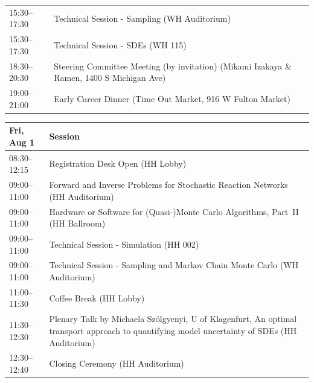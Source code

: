 \documentclass[12pt,lettersize,oneside]{book} %
\begin{document}
\begin{table}
{\begin{tabularx}{\textwidth}{>{\hsize=0.32\hsize}X|>{\hsize=1.7\hsize}X}
\cellcolor{\SessionLightColor}15:30--17:30 & \cellcolor{\SessionLightColor}Technical Session - Sampling (WH Auditorium) \\
\cellcolor{\SessionLightColor}15:30--17:30 & \cellcolor{\SessionLightColor}Technical Session - SDEs (WH 115) \\
\cellcolor{\SessionTitleColor}18:30--20:30 & \cellcolor{\SessionTitleColor}Steering Committee Meeting (by invitation) (Mikami Izakaya \& Ramen, 1400 S Michigan Ave) \\
\cellcolor{\EmptyColor}19:00--21:00 & \cellcolor{\EmptyColor}Early Career Dinner (Time Out Market, 916 W Fulton Market) \\
\hline
\end{tabularx}
}
\end{table}

\begin{table}
{\footnotesize
\begin{tabularx}{\textwidth}{>{\hsize=0.32\hsize}X|>{\hsize=1.7\hsize}X}
\hline
\textbf{Fri, Aug 1} & \textbf{Session} \\
\hline
\cellcolor{\EmptyColor}08:30--12:15 & \cellcolor{\EmptyColor}Registration Desk Open (HH Lobby) \\
\cellcolor{\SessionTitleColor}09:00--11:00 & \cellcolor{\SessionTitleColor}Forward and Inverse Problems for Stochastic Reaction Networks (HH Auditorium) \\
\cellcolor{\SessionTitleColor}09:00--11:00 & \cellcolor{\SessionTitleColor}Hardware or Software for (Quasi-)Monte Carlo Algorithms, Part~II (HH Ballroom) \\
\cellcolor{\SessionLightColor}09:00--11:00 & \cellcolor{\SessionLightColor}Technical Session - Simulation (HH 002) \\
\cellcolor{\SessionLightColor}09:00--11:00 & \cellcolor{\SessionLightColor}Technical Session - Sampling and Markov Chain Monte Carlo (WH Auditorium) \\
\cellcolor{\EmptyColor}11:00--11:30 & \cellcolor{\EmptyColor}Coffee Break (HH Lobby) \\
\cellcolor{\PlenaryColor}11:30--12:30 & \cellcolor{\PlenaryColor}Plenary Talk by Michaela Sz\"olgyenyi, U of Klagenfurt, An optimal transport approach to quantifying model uncertainty of SDEs (HH Auditorium) \\
\cellcolor{\OpeningClosingColor}12:30--12:40 & \cellcolor{\OpeningClosingColor}Closing Ceremony (HH Auditorium) \\
\hline
\end{tabularx}
}
\end{table}
\end{document}

